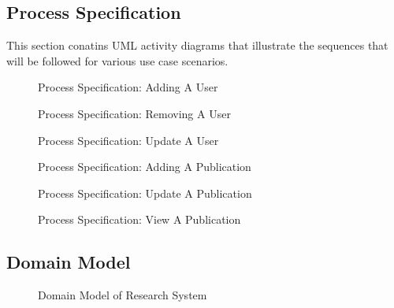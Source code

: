 \documentclass[a4paper]{article}
\begin{document}
	\subsection{Process Specification}
	This section conatins UML activity diagrams that illustrate the sequences that will be followed for various use case scenarios.
	\begin{figure}[H]
		\centering
		\caption{Process Specification: Adding A User}
	\end{figure}
	\begin{figure}[H]
		\centering
		\caption{Process Specification: Removing A User}
	\end{figure}
	\begin{figure}[H]
		\centering
		\caption{Process Specification: Update A User}
	\end{figure}
	\begin{figure}[H]
		\centering
		\caption{Process Specification: Adding A Publication}
	\end{figure}
	\begin{figure}[H]
		\centering
		\caption{Process Specification: Update A Publication}
	\end{figure}
	\begin{figure}[H]
		\centering
		\caption{Process Specification: View A Publication}
	\end{figure}
	\subsection{Domain Model}
	\begin{figure}[H]
		\caption{Domain Model of Research System \label{overflow}}
	\end{figure}
	\pagebreak
\end{document}
